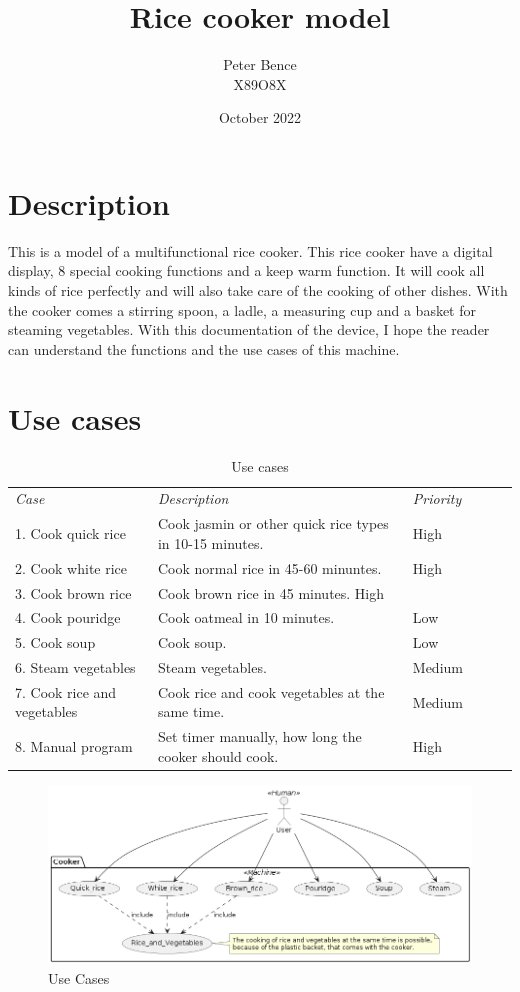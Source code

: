 \documentclass{scrartcl}
\title{Rice cooker model}
\author{Peter Bence\\X89O8X}
\date{October 2022}
\begin{document}
\maketitle
\newpage

\tableofcontents
\newpage

\section{Description}
This is a model of a multifunctional rice cooker. This rice cooker have a digital display, 8 special cooking functions and a keep warm function. It will cook all kinds of rice perfectly and will also take care of the cooking of other dishes. With the cooker comes a stirring spoon, a ladle, a measuring cup and a basket for steaming vegetables. With this documentation of the device, I hope the reader can understand the functions and the use cases of this machine.

\section{Use cases}
\begin{table}[H] \centering
    \caption{Use cases}\label{tab:usecasetable}
    \begin{tabular}{@{}ll@{}ll@{}ll} \hline
        \emph{Case} & \emph{Description} & \emph{Priority} \\
        1. Cook quick rice & Cook jasmin or other quick rice types in 10-15 minutes. & High\\
        2. Cook white rice & Cook normal rice in 45-60 minuntes. & High\\
        3. Cook brown rice & Cook brown rice in 45 minutes. High\\
        4. Cook pouridge & Cook oatmeal in 10 minutes. & Low\\
        5. Cook soup & Cook soup. & Low\\
        6. Steam vegetables & Steam vegetables. & Medium\\
        7. Cook rice and vegetables & Cook rice and cook vegetables at the same time. & Medium\\
        8. Manual program & Set timer manually, how long the cooker should cook. & High
    \end{tabular}
\end{table}
\begin{figure}[H]\centering
    \includegraphics[width=1.1\columnwidth]{UseCase.png}
    \caption{Use Cases}\label{fig:1}
\end{figure}
\end{document}
